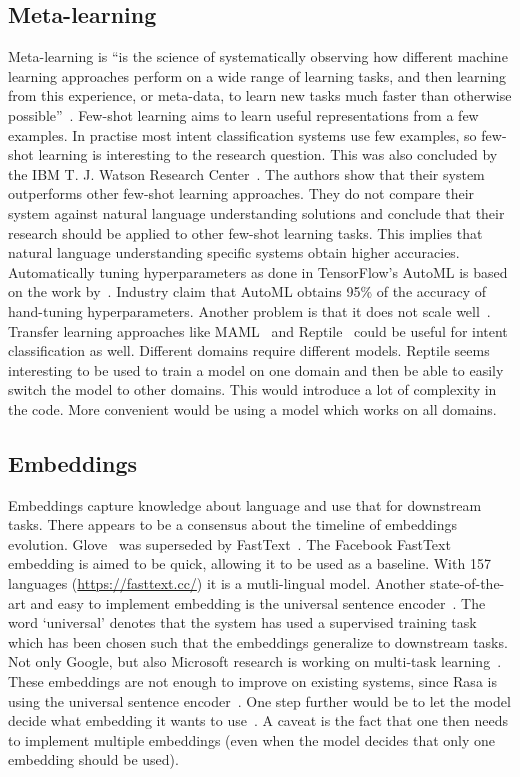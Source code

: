 \subsection{Meta-learning}
\label{subsec:meta-learning}
Meta-learning is ``is the science of systematically observing how different machine learning approaches perform on a wide range of learning tasks, and then learning from this experience, or meta-data, to learn new tasks much faster than otherwise possible''~\citet{vanschoren2018meta}.
Few-shot learning aims to learn useful representations from a few examples.
In practise most intent classification systems use few examples, so few-shot learning is interesting to the research question.
This was also concluded by the IBM T. J. Watson Research Center~\citep{yu2018diverse}.
The authors show that their system outperforms other few-shot learning approaches.
They do not compare their system against natural language understanding solutions and conclude that their research should be applied to other few-shot learning tasks.
This implies that natural language understanding specific systems obtain higher accuracies.
Automatically tuning hyperparameters as done in TensorFlow's AutoML is based on the work by~\citet{andrychowicz2016learning}.
Industry claim that AutoML obtains 95\% of the accuracy of hand-tuning hyperparameters.
Another problem is that it does not scale well~\citep{jones2017}.
Transfer learning approaches like MAML~\citep{finn2017model} and Reptile~\citep{nichol2018reptile} could be useful for intent classification as well.
Different domains require different models.
Reptile seems interesting to be used to train a model on one domain and then be able to easily switch the model to other domains.
This would introduce a lot of complexity in the code.
More convenient would be using a model which works on all domains.

\subsection{Embeddings}
\label{subsec:embeddings}
Embeddings capture knowledge about language and use that for downstream tasks.
There appears to be a consensus about the timeline of embeddings evolution.
Glove~\citep{pennington2014} was superseded by FastText~\citep{joulin2016bag}.
The Facebook FastText embedding is aimed to be quick, allowing it to be used as a baseline.
With 157 languages (\url{https://fasttext.cc/}) it is a mutli-lingual model.
Another state-of-the-art and easy to implement embedding is the universal sentence encoder~\citep{cer2018universal}.
The word `universal' denotes that the system has used a supervised training task which has been chosen such that the embeddings generalize to downstream tasks.
Not only Google, but also Microsoft research is working on multi-task learning~\citep{subramanian2018learning}.
These embeddings are not enough to improve on existing systems, since Rasa is using the universal sentence encoder~\citep{wiese2018}.
One step further would be to let the model decide what embedding it wants to use~\citep{kiela2018dynamic}.
A caveat is the fact that one then needs to implement multiple embeddings (even when the model decides that only one embedding should be used).
